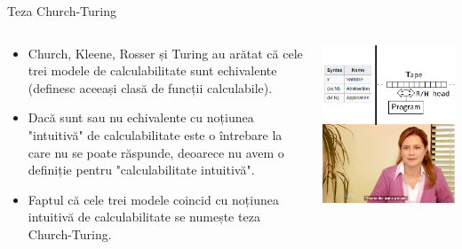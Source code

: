 \documentclass[xcolor=pdftex,romanian,colorlinks]{beamer}
\begin{document}
\begin{frame}{Teza Church-Turing}

\begin{columns}
\begin{column}{.6\textwidth}
\begin{itemize}
	\item Church, Kleene, Rosser și Turing au arătat că cele trei modele de calculabilitate sunt echivalente (definesc aceeași clasă de funcții calculabile).
	
	\medskip
	\item Dacă sunt sau nu echivalente cu noțiunea "intuitivă" de calculabilitate este o întrebare la care nu se poate răspunde, deoarece nu avem o definiție pentru "calculabilitate intuitivă".
	
	\medskip
	\item Faptul că cele trei modele coincid cu noțiunea intuitivă de calculabilitate se numește \alert{teza Church-Turing}.
\end{itemize}
\end{column}
\begin{column}{.4\textwidth}
\includegraphics[scale=.35]{images/same_thing.png}
\end{column}
\end{columns}
\end{frame}
\end{document}
